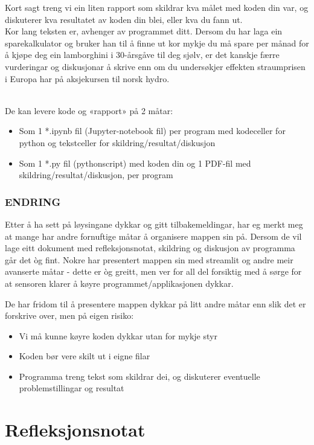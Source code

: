 \documentclass[12pt, titlepage]{article}
\begin{document}
Kort sagt treng vi ein liten rapport som skildrar kva målet med koden din var, og diskuterer kva resultatet av koden din blei, eller kva du fann ut.\\
Kor lang teksten er, avhenger av programmet ditt. 
Dersom du har laga ein sparekalkulator og bruker han til å finne ut kor mykje du må spare per månad for å kjøpe deg ein lamborghini i 30-årsgåve til deg sjølv, er det kanskje færre vurderingar og diskusjonar å skrive enn om du undersøkjer effekten straumprisen i Europa har på aksjekursen til norsk hydro.

~\\
De kan levere kode og «rapport» på 2 måtar:
\begin{itemize}
   \item {Som 1 *.ipynb fil (Jupyter-notebook fil) per program med kodeceller for python og tekstceller for skildring/resultat/diskusjon}
   \item {Som 1 *.py fil (pythonscript) med koden din og 1 PDF-fil med skildring/resultat/diskusjon, per program}
\end{itemize}

\color{blue}
\subsubsection*{ENDRING}
Etter å ha sett på løysingane dykkar og gitt tilbakemeldingar, har eg merkt meg at mange har andre fornuftige måtar å organisere mappen sin på.
Dersom de vil lage eitt dokument med refleksjonsnotat,  skildring og diskusjon av programma går det òg fint.
Nokre har presentert mappen sin med streamlit og andre meir avanserte måtar - dette er òg greitt, men ver for all del forsiktig med å sørge for at sensoren klarer å køyre programmet/applikasjonen dykkar.

De har fridom til å presentere mappen dykkar på litt andre måtar enn slik det er forskrive over, men på eigen risiko:
\begin{itemize}
   \item {Vi må kunne køyre koden dykkar utan for mykje styr}
   \item {Koden bør vere skilt ut i eigne filar}
   \item {Programma treng tekst som skildrar dei, og diskuterer eventuelle problemstillingar og resultat}
\end{itemize}

\color{black}


\section*{Refleksjonsnotat}
\end{document}

